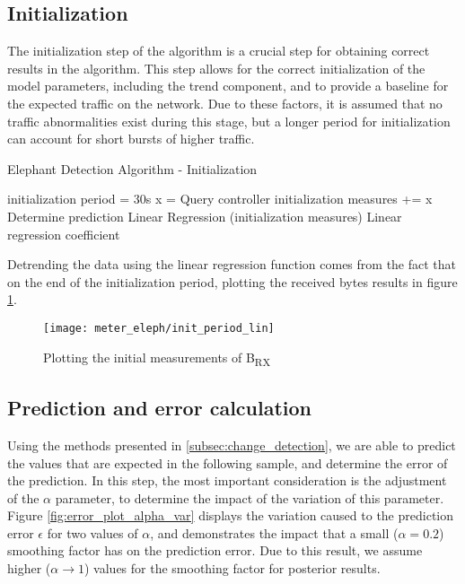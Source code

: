 \subsection{Initialization}

The initialization step of the algorithm is a crucial step for obtaining correct results in the algorithm. This step allows for the correct initialization of the model parameters, including the trend component, and to provide a 
baseline for the expected traffic on the network. Due to these factors, it is assumed that no traffic abnormalities exist during this stage, but a longer period for initialization can account for short bursts of higher traffic.

\begin{algorithm}[H]
    \caption{Elephant Detection Algorithm - Initialization} \label{alg:high_level}
    \begin{algorithmic}[1]
            \State initialization period = 30s
                \State x = Query controller
                \State initialization measures += x
                \State Determine prediction
            \EndWhile
            \State Linear Regression (initialization measures)
        \State \Return Linear regression coefficient
    \end{algorithmic}
\end{algorithm}

\par Detrending the data using the linear regression function comes from the fact that on the end of the initialization period, plotting the received bytes results in figure \ref{fig:init_plot}.

\begin{figure} 
    \centering
    \texttt{[image: meter\_eleph/init\_period\_lin]}
    \caption {Plotting the initial measurements of B\textsubscript{RX}}
    \label{fig:init_plot}
\end{figure} 

\subsection{Prediction and error calculation}

Using the methods presented in \ref{subsec:change_detection}, we are able to predict the values that are expected in the following sample, and determine the error of the prediction. In this step, the most important consideration is the adjustment of
the $\alpha$ parameter, to determine the impact of the variation of this parameter. Figure \ref{fig:error_plot_alpha_var} displays the variation caused to the prediction error $\epsilon$ for two values of $\alpha$, and demonstrates the impact that a
small ($\alpha = 0.2$) smoothing factor has on the prediction error. Due to this result, we assume higher ($\alpha \rightarrow 1$) values for the smoothing factor for posterior results.

